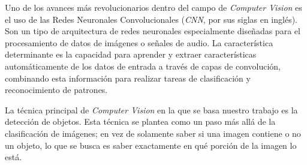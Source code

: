 \documentclass[a4paper]{article}
\begin{document}
Uno de los avances más revolucionarios dentro del campo de \textit{Computer Vision} es el uso de las Redes Neuronales Convolucionales (\textit{CNN}, por sus siglas en inglés). Son un tipo de arquitectura de redes neuronales especialmente diseñadas para el procesamiento de datos de imágenes o señales de audio. La característica determinante es la capacidad para aprender y extraer características automáticamente de los datos de entrada a través de capas de convolución, combinando esta información para realizar tareas de clasificación y reconocimiento de patrones.

La técnica principal de \textit{Computer Vision} en la que se basa nuestro trabajo es la detección de objetos. Esta técnica se plantea como un paso más allá de la clasificación de imágenes; en vez de solamente saber si una imagen contiene o no un objeto, lo que se busca es saber exactamente en qué porción de la imagen lo está.

\begin{figure}[H]
\end{figure}
\end{document}
